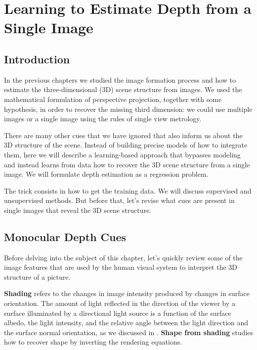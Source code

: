 \chapter{Learning to Estimate Depth from a Single Image}
\label{chapter:3D_learning_from_single_image}

\section{Introduction}

In the previous chapters we studied the image formation process and how to estimate the three-dimensional (3D) scene structure from images. We used the mathematical formulation of perspective projection, together with some hypothesis, in order to recover the missing third dimension: we could use multiple images or a single image using the rules of single view metrology. 

There are many other cues that we have ignored that also inform us about the 3D structure of the scene. Instead of building precise models of how to integrate them, here we will describe a learning-based approach that bypasses modeling and instead learns from data how to recover the 3D scene structure from a single image. We will formulate depth estimation as a regression problem. 

The trick consists in how to get the training data. We will discuss supervised and unsupervised methods. But before that, let's revise what cues are present in single images that reveal the 3D scene structure. 

\section{Monocular Depth Cues}

Before delving into the subject of this chapter, let's quickly review some of the image features that are used by the human visual system to interpret the 3D structure of a picture. 

{\bf Shading} refers to the changes in image intensity produced by changes in surface orientation. The amount of light reflected in the direction of the viewer by a surface illuminated by a directional light source is a function of the surface albedo, the light intensity, and the relative angle between the light direction and the surface normal orientation, as we discussed in \sect{\ref{sec:light_interacting_with_surfaces}}. {\bf Shape from shading} \cite{Barron2015ShapeIA,Freeman90d,Horn89a,Pentland90} studies how to recover shape by inverting the rendering equations. 

